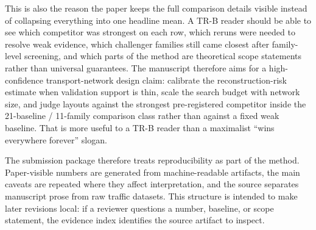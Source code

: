 This is also the reason the paper keeps the full comparison details visible
instead of collapsing everything into one headline mean. A
TR-B reader should be able to see which competitor was strongest on each row,
which reruns were needed to resolve weak evidence, which challenger families
still came closest after family-level screening, and which parts of the method
are theoretical scope statements rather than universal guarantees. The
manuscript therefore aims for a high-confidence transport-network design
claim: calibrate the reconstruction-risk estimate when validation support is
thin, scale the search budget with network size, and judge layouts against the
strongest pre-registered competitor inside the 21-baseline / 11-family
comparison class rather than against a fixed weak baseline. That is more
useful to a TR-B reader than a maximalist ``wins everywhere forever'' slogan.

The submission package therefore treats reproducibility as part of the method. Paper-visible numbers are generated from machine-readable artifacts, the main caveats are repeated where they affect interpretation, and the source separates manuscript prose from raw traffic datasets. This structure is intended to make later revisions local: if a reviewer questions a number, baseline, or scope statement, the evidence index identifies the source artifact to inspect.
